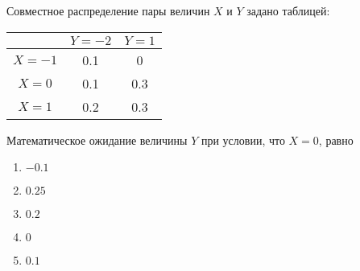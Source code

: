 \documentclass[t]{beamer}
\begin{document}
 \begin{frame} \label{14} 
\begin{block}{14} 

Совместное распределение пары величин $X$ и $Y$ задано таблицей:

\begin{center}
\begin{tabular}{c|cc}
 & $Y=-2$ & $Y=1$ \\
\hline
$X=-1$ & 0.1 & 0 \\
$X=0$ & 0.1 & 0.3 \\
$X=1$ & 0.2 & 0.3 \\
\end{tabular}
\end{center}
\vspace{0.2cm} 
 
 Математическое ожидание величины $Y$ при условии, что $X=0$, равно
 


 \end{block} 
\begin{enumerate} 
\item[] \hyperlink{14-No}{\beamergotobutton{} $-0.1$}
\item[] \hyperlink{14-Yes}{\beamergotobutton{} $0.25$}
\item[] \hyperlink{14-No}{\beamergotobutton{} $0.2$}
\item[] \hyperlink{14-No}{\beamergotobutton{} $0$}
\item[] \hyperlink{14-No}{\beamergotobutton{} $0.1$}
\end{enumerate} 
\end{frame} 
\end{document}
